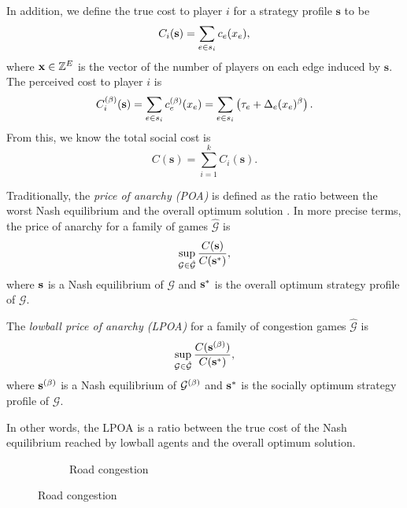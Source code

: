 \documentclass[twoside]{article}
\begin{document}
\begin{multicols}{2}
In addition, we define the true cost to player $i$ for a strategy profile
$\mathbf{s}$ to be
\[
  C_i(\mathbf{s}) = \sum\limits_{e \in s_i}c_e(x_e),
\]
where $\mathbf{x}
\in \mathbb{Z}^E$ is the vector of the number of players on each edge induced by
$\mathbf{s}$.  The perceived cost to player $i$ is
\[
  C^{(\beta)}_i(\mathbf{s}) = \sum\limits_{e \in s_i}c_e^{(\beta)}(x_e) = \sum\limits_{e \in
  s_i}\left(\tau_e + \Delta_e(x_e)^\beta\right).
\]
From this, we know the total social cost is
\[
  C(\mathbf{s}) = \sum_{i=1}^{k}C_i(\mathbf{s}).
\]
        
Traditionally, the \textit{price of anarchy (POA)} is defined as the ratio
between the worst Nash equilibrium and the overall optimum solution
\cite{Koutsoupias2009}.  In more precise terms, the price of anarchy for a
family of games $\hat{\mathcal{G}}$ is
\[
  \sup_{\mathcal{G} \in \hat{\mathcal{G}}} \frac{C(\mathbf{s})}{C(\mathbf{s}^*)},
\]
where $\mathbf{s}$ is a Nash equilibrium of $\mathcal{G}$ and $\mathbf{s}^*$ is the overall
optimum strategy profile of $\mathcal{G}$.

\begin{defn}
  The \textit{lowball price of anarchy (LPOA)} for a family of congestion games
  $\hat{\mathcal{G}}$ is
  \begin{equation}
    \sup_{\mathcal{G} \in \hat{\mathcal{G}}} \frac{C(\mathbf{s}^{(\beta)})}{C(\mathbf{s}^*)},
    \label{eq:lpoa}
  \end{equation}
  where $\mathbf{s}^{(\beta)}$ is a Nash equilibrium of $\mathcal{G}^{(\beta)}$ and $\mathbf{s}^*$ is the
  socially optimum strategy profile of $\mathcal{G}$.
\end{defn} In other words, the LPOA is a ratio between the true cost of the Nash
equilibrium reached by lowball agents and the overall optimum solution.

\begin{figure}[H]
  \centering
  \begin{subfigure}[b]{\linewidth}
    \centering
    \caption{Road congestion}
    \label{fig:road}
  \end{subfigure}


\end{figure}
\end{multicols}
\end{document}
